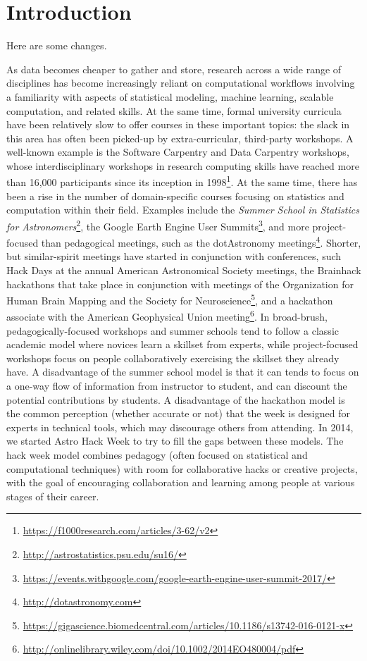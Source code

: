 \section*{Introduction}
\label{sec:introduction}

Here are some changes.

As data becomes cheaper to gather and store, research across a wide range of disciplines has become increasingly reliant on computational workflows involving a familiarity with aspects of statistical modeling, machine learning, scalable computation, and related skills.
At the same time, formal university curricula have been relatively slow to offer courses in these important topics: the slack in this area has often been picked-up by extra-curricular, third-party workshops.
A well-known example is the Software Carpentry and Data Carpentry workshops, whose interdisciplinary workshops in research computing skills have reached more than 16,000 participants since its inception in 1998\footnote{\url{https://f1000research.com/articles/3-62/v2}}.
At the same time, there has been a rise in the number of domain-specific courses focusing on statistics and computation within their field.
Examples include the \textit{Summer School in Statistics for Astronomers}\footnote{\url{http://astrostatistics.psu.edu/su16/}}, the Google Earth Engine User Summits\footnote{\url{https://events.withgoogle.com/google-earth-engine-user-summit-2017/}}, and more project-focused than pedagogical meetings, such as the dotAstronomy meetings\footnote{\url{http://dotastronomy.com}}.
Shorter, but similar-spirit meetings have started in conjunction with conferences, such Hack Days at the annual American Astronomical Society meetings, the Brainhack hackathons that take place in conjunction with meetings of the Organization for Human Brain Mapping and the Society for Neuroscience\footnote{\url{https://gigascience.biomedcentral.com/articles/10.1186/s13742-016-0121-x}}, and a hackathon associate with the American Geophysical Union meeting\footnote{\url{http://onlinelibrary.wiley.com/doi/10.1002/2014EO480004/pdf}}.
In broad-brush, pedagogically-focused workshops and summer schools tend to follow a classic academic model where novices learn a skillset from experts, while project-focused workshops focus on people collaboratively exercising the skillset they already have.
A disadvantage of the summer school model is that it can tends to focus on a one-way flow of information from instructor to student, and can discount the potential contributions by students.
A disadvantage of the hackathon model is the common perception (whether accurate or not) that the week is designed for experts in technical tools, which may discourage others from attending.
In 2014, we started Astro Hack Week to try to fill the gaps between these models.
The hack week model combines pedagogy (often focused on statistical and computational techniques) with room for collaborative hacks or creative projects, with the goal of encouraging collaboration and learning among people at various stages of their career.

